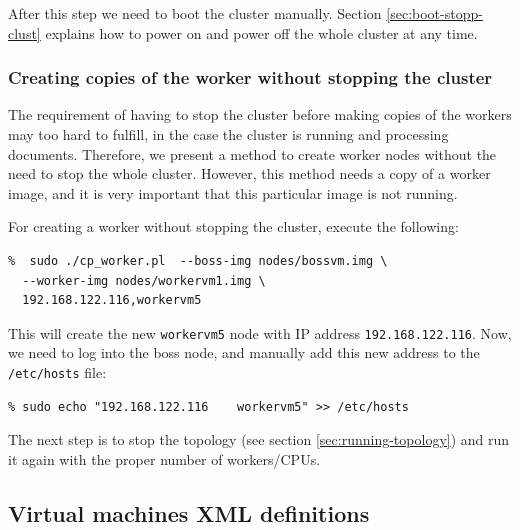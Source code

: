 \documentclass[a4]{article}
\begin{document}
After this step we need to boot the cluster manually. Section
\ref{sec:boot-stopp-clust} explains how to power on and power off the whole
cluster at any time.

\subsubsection*{Creating copies of the worker without stopping the cluster}
\label{sec:creat-copi-work}

The requirement of having to stop the cluster before making copies of the
workers may too hard to fulfill, in the case the cluster is running and
processing documents. Therefore, we present a method to create worker
nodes without the need to stop the whole cluster. However, this method needs
a copy of a worker image, and it is very important that this particular
image is not running.

For creating a worker without stopping the cluster, execute the following:

\begin{verbatim}
%  sudo ./cp_worker.pl  --boss-img nodes/bossvm.img \
  --worker-img nodes/workervm1.img \
  192.168.122.116,workervm5
\end{verbatim}

This will create the new \texttt{workervm5} node with IP address
\texttt{192.168.122.116}. Now, we need to log into the boss node, and
manually add this new address to the \texttt{/etc/hosts} file:

\begin{verbatim}
% sudo echo "192.168.122.116	workervm5" >> /etc/hosts
\end{verbatim}

The next step is to stop the topology (see section
\ref{sec:running-topology}) and run it again with the proper number of
workers/CPUs.

\subsection{Virtual machines XML definitions}
\label{sec:virtual-machines-xml}
\end{document}
